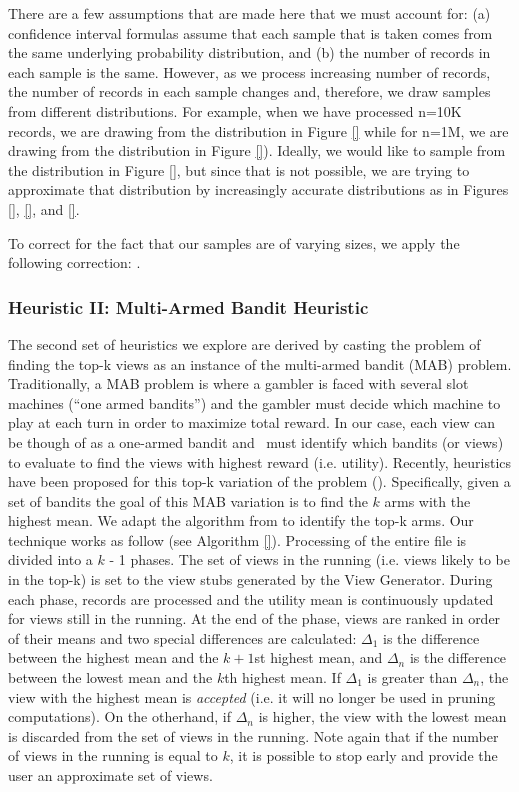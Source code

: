 There are a few assumptions that are made here that we must account for: (a)
confidence interval formulas assume that each sample that is taken comes from
the same underlying probability distribution, and (b) the number of records in
each sample is the same. However, as we process increasing number of records,
the number of records in each sample changes and, therefore, we draw samples
from different distributions.
For example, when we have processed n=10K records, we are drawing from the
distribution in Figure \ref{} while for n=1M, we are drawing from the
distribution in Figure \ref{}).
Ideally, we would like to sample from the distribution in Figure \ref{}, but
since that is not possible, we are trying to approximate that distribution by
increasingly accurate distributions as in Figures \ref{}, \ref{}, and \ref{}.

To correct for the fact that our samples are of varying sizes, we apply the
following correction: .

\subsubsection{Heuristic II: Multi-Armed Bandit Heuristic}
\label{subsubsec:multi_armed_bandit}
The second set of heuristics we explore are derived by casting the problem of
finding the top-k views as an instance of the multi-armed bandit (MAB) problem. 
Traditionally, a MAB problem is where a gambler is faced with several slot
machines (``one armed bandits'') and the gambler must decide which machine to
play at each turn in order to maximize total reward. 
In our case, each view can be though of as a one-armed bandit and \SeeDB\ must
identify which bandits (or views) to evaluate to find the views with highest
reward (i.e. utility).
Recently, heuristics have been proposed for this top-k variation of the problem
(\cite{}). 
Specifically, given a set of bandits the goal of this MAB variation is to find
the $k$ arms with the highest mean.
We adapt the algorithm from \cite{} to identify the top-k arms.
Our technique works as follow (see Algorithm \ref{}).
Processing of the entire file is divided into a $k$ - 1 phases. 
The set of views in the running (i.e. views likely to be in the top-k) is set to
the view stubs generated by the View Generator.
During each phase, records are
processed and the utility mean is continuously updated for views still in
the running.
At the end of the phase, views are ranked in order of their means and
two special differences are calculated: $\Delta_1$ is the difference between the
highest mean and the $k+1$st highest mean, and $\Delta_n$ is the difference
between the lowest mean and the $k$th highest mean.
If $\Delta_1$ is greater than $\Delta_n$, the view with the highest mean is
{\it accepted} (i.e. it will no longer be used in pruning computations). On the
otherhand, if $\Delta_n$ is higher, the view with the lowest mean is discarded
from the set of views in the running.
Note again that if the number of views in the running is equal to $k$, it is
possible to stop early and provide the user an approximate set of views.

